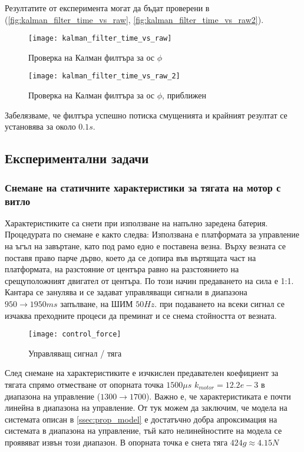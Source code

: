 Резултатите от експеримента могат да бъдат проверени в (\autoref{fig:kalman_filter_time_vs_raw}, \autoref{fig:kalman_filter_time_vs_raw2}).

\begin{figure}[htpb!]
    \centering
    \texttt{[image: kalman\_filter\_time\_vs\_raw]}
    \caption{Проверка на Калман филтъра за ос \(\phi\)}
    \label{fig:kalman_filter_time_vs_raw}
\end{figure}

\begin{figure}[htpb!]
    \centering
    \texttt{[image: kalman\_filter\_time\_vs\_raw\_2]}
    \caption{Проверка на Калман филтъра за ос \(\phi\), приближен}
    \label{fig:kalman_filter_time_vs_raw2}
\end{figure}

Забелязваме, че филтъра успешно потиска смущенията и крайният резултат се установява за около \(0.1s\).

\FloatBarrier

\subsection{Експериментални задачи}

\subsubsection{Снемане на статичните характеристики за тягата на мотор с витло}

Характеристиките са снети при използване на напълно заредена батерия.
Процедурата по снемане е както следва:
Използвана е платформата за управление на ъгъл на завъртане,
като под рамо едно е поставена везна. Върху везната се поставя право парче дърво, което да се допира във въртящата част на платформата,
на разстояние от центъра равно на разстоянието на срещуположният двигател от центъра. 
По този начин предаването на сила е 1:1.
Кантара се занулява и се задават управляващи сигнали в диапазона \(950 \to 1950ms\) запълване,
на ШИМ \(50Hz\). при подаването на всеки сигнал се изчаква преходните процеси да преминат и се снема стойността от везната.

\begin{figure}[htpb!]
    \centering
    \texttt{[image: control\_force]}
    \caption{Управляващ сигнал / тяга}
    \label{fig:control_force}
\end{figure}

След снемане на характеристиките е изчкислен предавателен коефициент за тягата спрямо отместване от опорната точка 
\(1500\mu s\) \(k_{motor} = 12.2e-3\) в диапазона на управление (\(1300\to1700\)).
Важно е, че характеристиката е почти линейна в диапазона на управление.
От тук можем да заключим, че модела на системата описан в \autoref{ssec:prop_model} 
е достатъчно добра апроксимация на системата в диапазона на управление, тъй като нелинейностите на
модела се проявяват извън този диапазон.
В опорната точка е снета тяга \(424g \approx 4.15N\)

